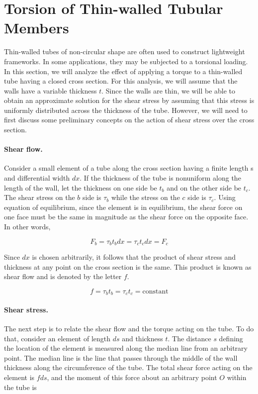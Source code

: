 \documentclass[
10pt,
a4paper,
openany,
svgnames,
]{book} %
\begin{document}
\section{Torsion of Thin-walled Tubular Members}

Thin-walled tubes of non-circular shape are often used to construct lightweight frameworks. In some applications, they may be subjected to a torsional loading. In this section, we will analyze the effect of applying a torque to a thin-walled tube having a closed cross section. For this analysis, we will assume that the walls have a variable thickness $t$. Since the walls are thin, we will be able to obtain an approximate solution for the shear stress by assuming that this stress is uniformly distributed across the thickness of the tube. However, we will need to first discuss some preliminary concepts on the action of shear stress over the cross section.

\paragraph{Shear flow.} Consider a small element of a tube along the cross section having a finite length s and differential width $dx$. If the thickness of the tube is nonuniform along the length of the wall, let the thickness on one side be $t_b$ and on the other side be $t_c$. The shear stress on the $b$ side is $\tau_b$ while the stress on the $c$ side is $\tau_c$. Using equation of equilibrium, since the element is in equilibrium, the shear force on one face must be the same in magnitude as the shear force on the opposite face. In other words,

\[F_b = \tau_bt_bdx = \tau_ct_cdx = F_c\]

Since $dx$ is chosen arbitrarily, it follows that the product of shear stress and thickness at any point on the cross section is the same. This product is known as shear flow and is denoted by the letter $f$.

\begin{equation}
  f = \tau_bt_b = \tau_ct_c = \text{constant}
\end{equation}

\paragraph{Shear stress.} The next step is to relate the shear flow and the torque acting on the tube. To do that, consider an element of length $ds$ and thickness $t$. The distance $s$ defining the location of the element is measured along the median line from an arbitrary point. The median line is the line that passes through the middle of the wall thickness along the circumference of the tube.
The total shear force acting on the element is $fds$, and the moment of this force about an arbitrary point $O$ within the tube is
\end{document}
